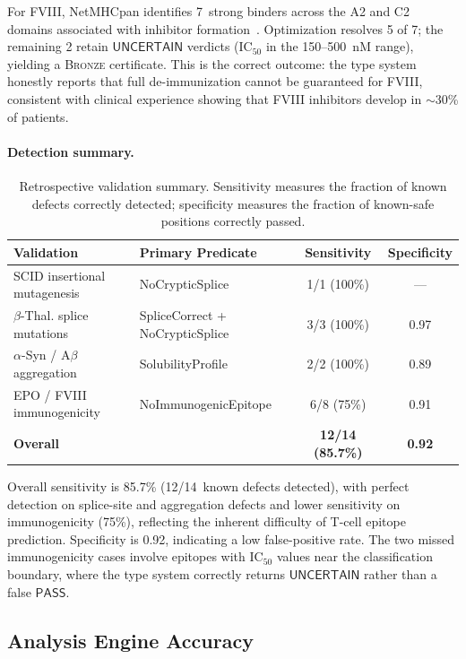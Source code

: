 \documentclass[acmsmall,review,anonymous]{acmart}
\newcommand{\PASS}{\ensuremath{\mathsf{PASS}}\xspace}
\newcommand{\UNCERTAIN}{\ensuremath{\mathsf{UNCERTAIN}}\xspace}
\newcommand{\BRONZE}{\textsc{Bronze}\xspace}
\begin{document}
For FVIII, NetMHCpan identifies 7~strong binders across the A2 and C2
domains associated with inhibitor
formation~\cite{geigert2014immunogenicity}.  Optimization resolves 5 of
7; the remaining 2 retain \UNCERTAIN{} verdicts (IC$_{50}$ in the
150--500~nM range), yielding a \BRONZE{} certificate.  This is the
correct outcome: the type system honestly reports that full de-immunization
cannot be guaranteed for FVIII, consistent with clinical experience
showing that FVIII inhibitors develop in $\sim$30\% of patients.

\paragraph{Detection summary.}

\begin{table}[t]
\centering
\caption{Retrospective validation summary.  Sensitivity measures the
         fraction of known defects correctly detected; specificity
         measures the fraction of known-safe positions correctly passed.}
\label{tab:retrosummary}
\begin{tabular}{llcc}
\toprule
\textbf{Validation} & \textbf{Primary Predicate} &
  \textbf{Sensitivity} & \textbf{Specificity} \\
\midrule
SCID insertional mutagenesis & NoCrypticSplice & 1/1 (100\%) & --- \\
$\beta$-Thal. splice mutations & SpliceCorrect + NoCrypticSplice &
  3/3 (100\%) & 0.97 \\
$\alpha$-Syn / A$\beta$ aggregation & SolubilityProfile &
  2/2 (100\%) & 0.89 \\
EPO / FVIII immunogenicity & NoImmunogenicEpitope &
  6/8 (75\%) & 0.91 \\
\midrule
\textbf{Overall} & & \textbf{12/14 (85.7\%)} & \textbf{0.92} \\
\bottomrule
\end{tabular}
\end{table}

Overall sensitivity is 85.7\% (12/14~known defects detected), with
perfect detection on splice-site and aggregation defects and lower
sensitivity on immunogenicity (75\%), reflecting the inherent difficulty
of T-cell epitope prediction.  Specificity is 0.92, indicating a low
false-positive rate.  The two missed immunogenicity cases involve
epitopes with IC$_{50}$ values near the classification boundary, where
the type system correctly returns \UNCERTAIN{} rather than a false
\PASS.

\subsection{Analysis Engine Accuracy}\label{sec:engineaccuracy}
\end{document}
